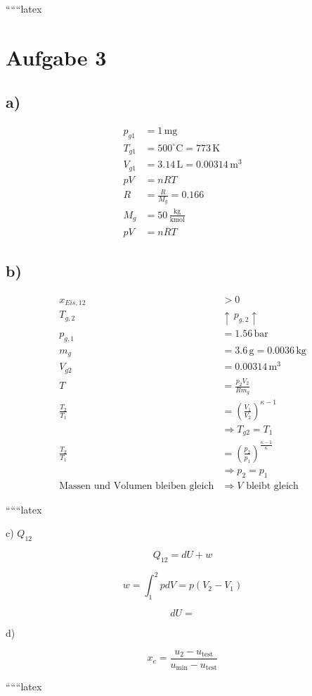 
``````latex


\section*{Aufgabe 3}

\subsection*{a)}
\begin{align*}
    p_{g1} &= 1 \, \text{mg} \\
    T_{g1} &= 500^\circ \text{C} = 773 \, \text{K} \\
    V_{g1} &= 3.14 \, \text{L} = 0.00314 \, \text{m}^3 \\
    pV &= nRT \\
    R &= \frac{R}{M_g} = 0.166 \\
    M_g &= 50 \, \frac{\text{kg}}{\text{kmol}} \\
    pV &= n \overline{R} T
\end{align*}

\subsection*{b)}
\begin{align*}
    x_{Eis,12} &> 0 \\
    T_{g,2} &\uparrow \, p_{g,2} \uparrow \\
    p_{g,1} &= 1.56 \, \text{bar} \\
    m_g &= 3.6 \, \text{g} = 0.0036 \, \text{kg} \\
    V_{g2} &= 0.00314 \, \text{m}^3 \\
    T &= \frac{p_2 V_2}{R m_g} \\
    \frac{T_2}{T_1} &= \left( \frac{V_1}{V_2} \right)^{\kappa - 1} \\
    &\Rightarrow T_{g2} = T_1 \\
    \frac{T_2}{T_1} &= \left( \frac{p_2}{p_1} \right)^{\frac{\kappa - 1}{\kappa}} \\
    &\Rightarrow p_2 = p_1 \\
    \text{Massen und Volumen bleiben gleich} &\Rightarrow V \text{ bleibt gleich}
\end{align*}

``````latex


c) \(Q_{12}\)

\[
Q_{12} = dU + w
\]

\[
w = \int_{1}^{2} p dV = p (V_2 - V_1)
\]

\[
dU =
\]

d) 

\[
x_e = \frac{u_2 - u_{\text{test}}}{u_{\text{min}} - u_{\text{test}}}
\]

``````latex


